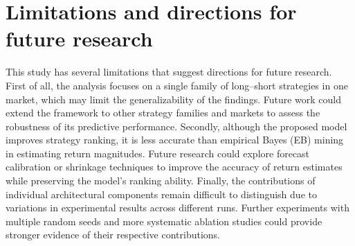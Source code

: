 \documentclass[pdflatex,sn-mathphys-num]{sn-jnl}%
\theoremstyle{thmstyleone}%
\theoremstyle{thmstyletwo}%
\theoremstyle{thmstylethree}%
\begin{document}
\section{Limitations and directions for future research}
This study has several limitations that suggest directions for future research. First of all, the analysis focuses on a single family of long–short strategies in one market, which may limit the generalizability of the findings. Future work could extend the framework to other strategy families and markets to assess the robustness of its predictive performance. Secondly, although the proposed model improves strategy ranking, it is less accurate than empirical Bayes (EB) mining in estimating return magnitudes. Future research could explore forecast calibration or shrinkage techniques to improve the accuracy of return estimates while preserving the model's ranking ability. Finally, the contributions of individual architectural components remain difficult to distinguish due to variations in experimental results across different runs. Further experiments with multiple random seeds and more systematic ablation studies could provide stronger evidence of their respective contributions.





\end{document}
